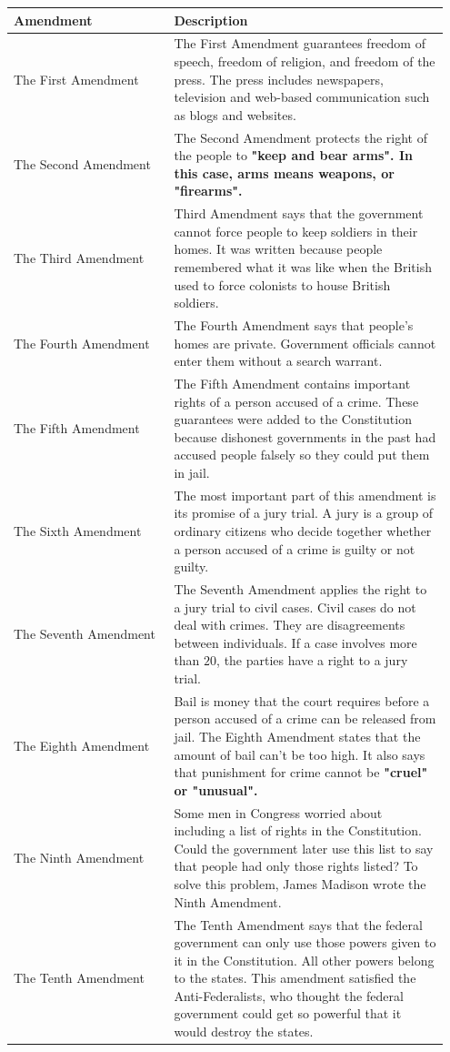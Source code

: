 \begin{center}
	\begin{table}[htbp]
		\begin{tabular}{ p{0.35\linewidth} | p{0.6\linewidth} } 
			\hline
			Amendment & Description \\
			\hline
			The First Amendment & The First Amendment guarantees freedom of speech,
			freedom of religion, and freedom of the press. The press includes
			newspapers, television and web-based communication such as blogs and
			websites. \\ \hline
			The Second Amendment & The Second Amendment protects the right of the
			people to \bf{"keep and bear arms"}. In this case, arms means
			weapons, or \bf{"firearms"}. \\ \hline
			The Third Amendment &  Third Amendment says that the government cannot
			force people to keep soldiers in their homes. It was written because
			people remembered what it was like when the British used to force
			colonists to house British soldiers. \\ \hline
			The Fourth Amendment & The Fourth Amendment says that people's homes are
			private. Government officials cannot enter them without a search warrant.
			\\ \hline
			The Fifth Amendment & The Fifth Amendment contains important rights of a
			person accused of a crime. These guarantees were added to the
			Constitution because dishonest governments in the past had accused people
			falsely so they could put them in jail. \\ \hline
			The Sixth Amendment & The most important part of this amendment is its
			promise of a jury trial. A jury is a group of ordinary citizens who
			decide together whether a person accused of a crime is guilty or not
			guilty. \\ \hline
			The Seventh Amendment & The Seventh Amendment applies the right to a jury
			trial to civil cases. Civil cases do not deal with crimes. They are
			disagreements between individuals. If a case involves more than $20$, the
			parties have a right to a jury trial. \\ \hline
			The Eighth Amendment & Bail is money that the court requires before a
			person accused of a crime can be released from jail. The Eighth Amendment
			states that the amount of bail can't be too high. It also says that
			punishment for crime cannot be \bf{"cruel"} or \bf{"unusual"}. \\
			\hline
			The Ninth Amendment & Some men in Congress worried about including a list
			of rights in the Constitution. Could the government later use this list
			to say that people had only those rights listed? To solve this problem,
			James Madison wrote the Ninth Amendment. \\ \hline
			The Tenth Amendment & The Tenth Amendment says that the federal
			government can only use those powers given to it in the Constitution. All
			other powers belong to the states. This amendment satisfied the
			Anti-Federalists, who thought the federal government could get so
			powerful that it would destroy the states. \\ \hline
		\end{tabular}
		

\end{table}
\end{center}
